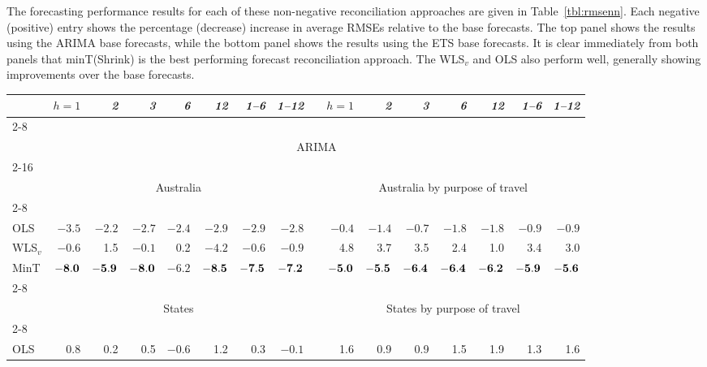 \documentclass[10pt,a4paper]{article}
\begin{document}
\begin{enumerate}
{  The forecasting performance results for each of these non-negative reconciliation approaches are given in Table~\ref{tbl:rmsenn}. Each negative (positive) entry shows the percentage (decrease) increase in average RMSEs relative to the base forecasts. The top panel shows the results using the ARIMA base forecasts, while the bottom panel shows the results using the ETS base forecasts. It is clear immediately from both panels that minT(Shrink) is the best performing forecast reconciliation approach. The WLS$_v$ and OLS also perform well, generally showing improvements over the base forecasts.}

  \begin{table*}[!htb]
  \centering\color{blue}
  \fontsize{9}{12}\rm\tabcolsep=0.095cm
  \caption{Out-of-sample forecast performances for Australian domestic tourism flows.}
  \label{tbl:rmsenn}
  \begin{threeparttable}
  \begin{tabular}{lrrrrrrrrrrrrrrr}
  \toprule
  & \it{$h=1$} & \it{2} & \it{3} & \it{6} & \it{12} & \it{1--6} & \it{1--12} & & \it{$h=1$} & \it{2} & \it{3} & \it{6} & \it{12} & \it{1--6} & \it{1--12} \\
  \cline{2-8} \cline{10-16} \\[-0.3cm]
  & \multicolumn{15}{c}{ARIMA} \\
  \cline{2-16} \\[-0.3cm]
  & \multicolumn{7}{c}{Australia} & & \multicolumn{7}{c}{Australia by purpose of travel} \\
  \cline{2-8}\cline{10-16} \\[-0.3cm]
  OLS & $-3.5$ & $-2.2$ & $-2.7$ & $-2.4$ & $-2.9$ & $-2.9$ & $-2.8$ & & $-0.4$ & $-1.4$ & $-0.7$ & $-1.8$ & $-1.8$ & $-0.9$ & $-0.9$ \\
  WLS$_v$ & $-0.6$ & 1.5 & $-0.1$ & 0.2 & $-4.2$ & $-0.6$ & $-0.9$ & & 4.8 & 3.7 & 3.5 & 2.4 & 1.0 & 3.4 & 3.0 \\
  MinT & $\bf{ -8.0}$ & ${\bf -5.9}$ & ${\bf -8.0}$ & ${\bm -6.2}$ & ${\bf -8.5}$ & ${\bf -7.5}$ & ${\bf -7.2}$ & & ${\bf -5.0}$ & ${\bf -5.5}$ & ${\bf -6.4}$ & ${\bf -6.4}$ & ${\bf -6.2}$ & ${\bf -5.9}$ & ${\bf -5.6}$ \\
  \cline{2-8}\cline{10-16} \\[-0.3cm]
  & \multicolumn{7}{c}{States} & & \multicolumn{7}{c}{States by purpose of travel} \\
  \cline{2-8}\cline{10-16} \\[-0.3cm]
  OLS & 0.8 & 0.2 & 0.5 & $-0.6$ & 1.2 & 0.3 & $-0.1$ & & 1.6 & 0.9 & 0.9 & 1.5 & 1.9 & 1.3 & 1.6 \\

\end{tabular}
\end{threeparttable}
\end{table*}
\end{enumerate}
\end{document}
